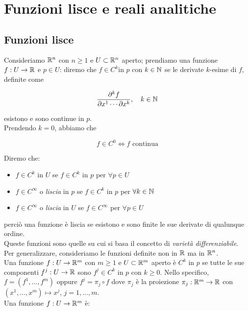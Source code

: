 \section{Funzioni lisce e reali analitiche}

\subsection{Funzioni lisce}

Consideriamo $ \mathbb{R}^{n} $ con $ n \geq 1 $ e $ U \subset \mathbb{R}^{n} $ aperto; prendiamo una funzione $ f : U \to \mathbb{R} $ e $ p \in U $: diremo che $ f \in C^{k} $in $ p $ con $ k \in \mathbb{N} $ se le derivate $ k $-esime di $ f $, definite come

\begin{equation}
	\dfrac{\partial^{k} f}{\partial x^{1} \cdots \partial x^{k}}, \quad k \in \mathbb{N}
\end{equation}

esistono e sono continue in $ p $.\\
Prendendo $ k = 0 $,  abbiamo che

\begin{equation}
	f \in C^{0} \iff f \text{ continua}
\end{equation}

Diremo che:

\begin{itemize}
	\item $ f \in C^{k} $ in $ U $ se $ f \in C^{k} $ in $ p $ per $ \forall p \in U $
	
	\item $ f \in C^{\infty} $ o \textit{liscia} in $ p $ se $ f \in C^{k} $ in $ p $ per $ \forall k \in \mathbb{N} $
	
	\item $ f \in C^{\infty} $ o \textit{liscia} in $ U $ se $ f \in C^{\infty} $ per $ \forall p \in U $
\end{itemize}

perciò una funzione è liscia se esistono e sono finite le sue derivate di qualunque ordine.\\
Queste funzioni sono quelle su cui si basa il concetto di \textit{varietà differenziabile}.\\

Per generalizzare, consideriamo le funzioni definite non in $ \mathbb{R} $ ma in $ \mathbb{R}^{n} $.\\
Una funzione $ f : U \to \mathbb{R}^{m} $ con $ m \geq 1 $ e $ U \subset \mathbb{R}^{m} $ aperto è $ C^{k} $ in $ p $ se tutte le sue componenti $ f^{j} : U \to \mathbb{R} $ sono $ f^{j} \in C^{k} $ in $ p $ con $ k \geq 0 $. Nello specifico, $ f = (f^{1}, \dots, f^{m}) $ oppure $ f^{j} = \pi_{j} \circ f $ dove $ \pi_{j} $ è la proiezione $ \pi_{j} : \mathbb{R}^{m} \to \mathbb{R} $ con $ (x^{1}, \dots, x^{m}) \mapsto x^{j} $, $ j = 1, \dots, m $.\\
Una funzione $ f : U \to \mathbb{R}^{m} $ è:

